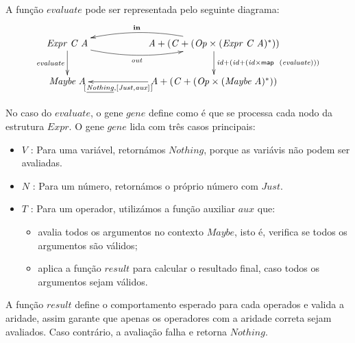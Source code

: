 \documentclass[11pt, a4paper, fleqn]{article}
\newcommand{\Conid}[1]{\mathit{#1}}
\newcommand{\Varid}[1]{\mathit{#1}}
\begin{document}
A função \ensuremath{\Varid{evaluate}} pode ser representada pelo seguinte diagrama:
\begin{eqnarray*}
\xymatrix@C=2cm{
    \ensuremath{\Conid{Expr}\;\Conid{C}\;\Conid{A}}
           \ar[d]_-{\ensuremath{\Varid{evaluate}}}
           \ar@/^-1pc/[r]_-{\ensuremath{\Varid{out}}}
&
    \ensuremath{\Conid{A}\mathbin{+}(\Conid{C}\mathbin{+}(\Conid{Op}\times(\Conid{Expr}\;\Conid{C}\;\Conid{A})}^*))
           \ar[d]^{\ensuremath{\Varid{id}\mathbin{+}(\Varid{id}\mathbin{+}(\Varid{id}\times\map \;(\Varid{evaluate})))}}
           \ar@/^-1pc/[l]_-{\ensuremath{\mathbf{in}}}
\\
    \ensuremath{\Conid{Maybe}\;\Conid{A}}
&
    \ensuremath{\Conid{A}\mathbin{+}(\Conid{C}\mathbin{+}(\Conid{Op}\times(\Conid{Maybe}\;\Conid{A})}^*))
            \ar[l]^-{\ensuremath{[\mskip1.5mu \underline{\Conid{Nothing}},\alt{\Conid{Just}}{\Varid{aux}}\mskip1.5mu]}}
}
\end{eqnarray*}

No caso do \ensuremath{\Varid{evaluate}}, o gene \ensuremath{\Varid{gene}} define como é que se processa cada nodo da estrutura \ensuremath{\Conid{Expr}}.
O gene \ensuremath{\Varid{gene}} lida com três casos principais:
\begin{itemize}
\item \ensuremath{\Conid{V}} : Para uma variável, retornámos \ensuremath{\Conid{Nothing}}, porque as variávis não podem ser avaliadas.
\item \ensuremath{\Conid{N}} : Para um número, retornámos o próprio número com \ensuremath{\Conid{Just}}.
\item \ensuremath{\Conid{T}} : Para um operador, utilizámos a função auxiliar \ensuremath{\Varid{aux}} que:
    \begin{itemize}
        \item avalia todos os argumentos no contexto \ensuremath{\Conid{Maybe}}, isto é, verifica se todos os argumentos são válidos;
        \item aplica a função \ensuremath{\Varid{result}} para calcular o resultado final, caso todos os argumentos sejam válidos.
    \end{itemize}
\end{itemize}

A função \ensuremath{\Varid{result}} define o comportamento esperado para cada operados e valida a aridade, assim garante que apenas os operadores com a aridade correta sejam avaliados.
Caso contrário, a avaliação falha e retorna \ensuremath{\Conid{Nothing}}.
\end{document}
